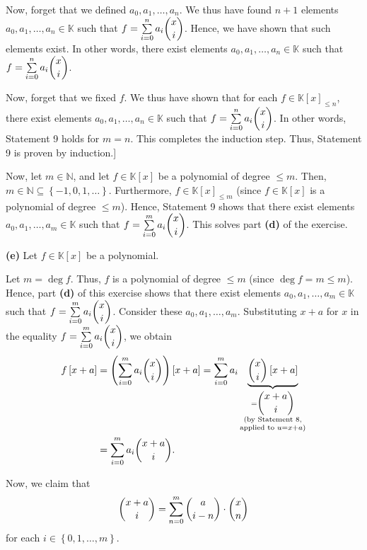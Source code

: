 \documentclass[paper=a4, fontsize=12pt]{scrartcl}%
\let\sumnonlimits\sum
\renewcommand{\sum}{\sumnonlimits\limits}
\theoremstyle{plainsl}
\theoremstyle{definition}
\theoremstyle{remark}
\begin{document}
Now, forget that we defined $a_{0},a_{1},\ldots,a_{n}$. We thus have found
$n+1$ elements $a_{0},a_{1},\ldots,a_{n}\in\mathbb{K}$ such that $f=\sum
_{i=0}^{n}a_{i}\dbinom{x}{i}$. Hence, we have shown that such elements exist.
In other words, there exist elements $a_{0},a_{1},\ldots,a_{n}\in\mathbb{K}$
such that $f=\sum_{i=0}^{n}a_{i}\dbinom{x}{i}$.

Now, forget that we fixed $f$. We thus have shown that for each $f\in
\mathbb{K}\left[  x\right]  _{\leq n}$, there exist elements $a_{0}%
,a_{1},\ldots,a_{n}\in\mathbb{K}$ such that $f=\sum_{i=0}^{n}a_{i}\dbinom
{x}{i}$. In other words, Statement 9 holds for $m=n$. This completes the
induction step. Thus, Statement 9 is proven by induction.]

Now, let $m\in\mathbb{N}$, and let $f\in\mathbb{K}\left[  x\right]  $ be a
polynomial of degree $\leq m$. Then, $m\in\mathbb{N}\subseteq\left\{
-1,0,1,\ldots\right\}  $. Furthermore, $f\in\mathbb{K}\left[  x\right]  _{\leq
m}$ (since $f\in\mathbb{K}\left[  x\right]  $ is a polynomial of degree $\leq
m$). Hence, Statement 9 shows that there exist elements $a_{0},a_{1}%
,\ldots,a_{m}\in\mathbb{K}$ such that $f=\sum_{i=0}^{m}a_{i}\dbinom{x}{i}$.
This solves part \textbf{(d)} of the exercise.

\bigskip

\textbf{(e)} Let $f\in\mathbb{K}\left[  x\right]  $ be a polynomial.

Let $m=\deg f$. Thus, $f$ is a polynomial of degree $\leq m$ (since $\deg
f=m\leq m$). Hence, part \textbf{(d)} of this exercise shows that there exist
elements $a_{0},a_{1},\ldots,a_{m}\in\mathbb{K}$ such that $f=\sum_{i=0}%
^{m}a_{i}\dbinom{x}{i}$. Consider these $a_{0},a_{1},\ldots,a_{m}$.
Substituting $x+a$ for $x$ in the equality $f=\sum_{i=0}^{m}a_{i}\dbinom{x}%
{i}$, we obtain%
\begin{align}
f\left[  x+a\right]   &  =\left(  \sum_{i=0}^{m}a_{i}\dbinom{x}{i}\right)
\left[  x+a\right]  =\sum_{i=0}^{m}a_{i}\underbrace{\dbinom{x}{i}\left[
x+a\right]  }_{\substack{=\dbinom{x+a}{i}\\\text{(by Statement 8,}%
\\\text{applied to }u=x+a\text{)}}}\nonumber\\
&  =\sum_{i=0}^{m}a_{i}\dbinom{x+a}{i}. \label{sol.pol.fin-differences.e.1}%
\end{align}


Now, we claim that%
\begin{equation}
\dbinom{x+a}{i}=\sum_{n=0}^{m}\dbinom{a}{i-n}\cdot\dbinom{x}{n}
\label{sol.pol.fin-differences.e.2}%
\end{equation}
for each $i\in\left\{  0,1,\ldots,m\right\}  $.
\end{document}

